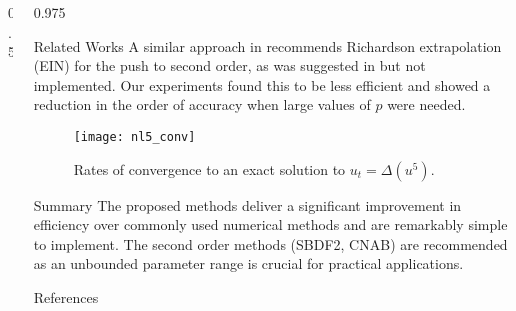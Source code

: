 \documentclass[]{beamer} %
\newlength{\sepwid}
\newlength{\onecolwid}
\begin{document}
\begin{frame}[t]
\begin{columns}[t]
			\begin{column}{0.5\sepwid}\end{column} %
			\begin{column}{0.975\onecolwid} %
				\begin{block}{Related Works}\vspace{-0.5cm}
				   \small{A similar approach in \cite{Duchemin2014} recommends Richardson extrapolation (EIN) for the push to second order, as was suggested in \cite{Smereka2003semiimplicit} but not implemented. Our experiments found this to be less efficient and showed a reduction in the order of accuracy when large values of $p$ were needed.}
				\end{block}
\vspace{-1.cm}
\begin{figure}\centering
\texttt{[image: nl5\_conv]}
\caption{Rates of convergence to an exact solution to $u_t = \Delta(u^5)$.}
\end{figure}
				\vspace{-2.15cm}
				\begin{block}{Summary} \vspace{-0.5cm}%
					\small{The proposed methods deliver a significant improvement in efficiency over commonly used numerical methods and are remarkably simple to implement.  The second order methods (SBDF2, CNAB) are recommended as an unbounded parameter range is crucial for practical applications.}
				\end{block}
				
				\vspace{-1.70cm}
				\begin{block}{References}\vspace{-1.0cm}
					\tiny{
					}
				\end{block}
				

\end{column}
\end{columns}
\end{frame}
\end{document}

